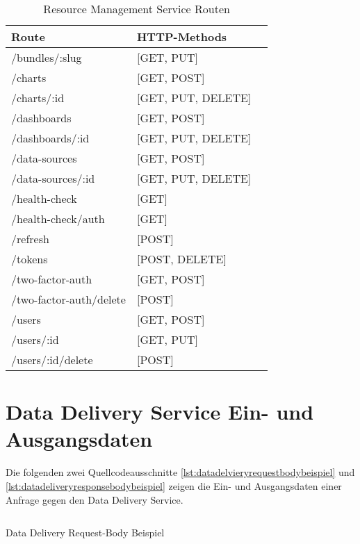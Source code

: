 \begin{table}[h]
\begin{center}
\begin{tabular}{llc}
Route & HTTP-Methods \\
\hline
/bundles/:slug          & [GET, PUT]         \\
/charts                 & [GET, POST]        \\
/charts/:id             & [GET, PUT, DELETE] \\
/dashboards             & [GET, POST]        \\
/dashboards/:id         & [GET, PUT, DELETE] \\
/data-sources           & [GET, POST]        \\
/data-sources/:id       & [GET, PUT, DELETE] \\
/health-check           & [GET]              \\
/health-check/auth      & [GET]              \\
/refresh                & [POST]             \\
/tokens                 & [POST, DELETE]     \\
/two-factor-auth        & [GET, POST]        \\
/two-factor-auth/delete & [POST]             \\
/users                  & [GET, POST]        \\
/users/:id              & [GET, PUT]         \\
/users/:id/delete       & [POST]             \\
\end{tabular}
\end{center}
\caption{Resource Management Service Routen}
\label{tab:resourcemanagementservicerouten}
\end{table}

\newpage

\section*{Data Delivery Service Ein- und Ausgangsdaten}
\label{sec:datadeliveryserviceeinundausgangsdaten}

Die folgenden zwei Quellcodeausschnitte \ref{lst:datadelvieryrequestbodybeispiel}
und \ref{lst:datadeliveryresponsebodybeispiel} zeigen die Ein- und
Ausgangsdaten einer Anfrage gegen den Data Delivery Service.

\begin{listing}[h]
    \inputminted{jsx}{snippets/json/data-delivery-example/request.data-delivery.txt}
    \caption{Data Delivery Request-Body Beispiel}
    \label{lst:datadelvieryrequestbodybeispiel}
\end{listing}

